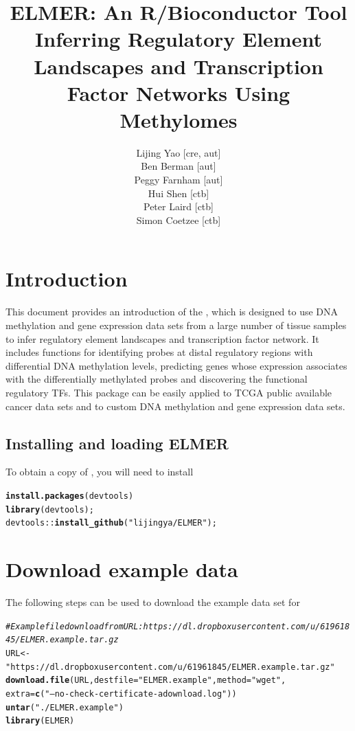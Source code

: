 \documentclass{article}\usepackage[]{graphicx}\usepackage[usenames,dvipsnames]{color}
\title{ELMER: An R/Bioconductor Tool \\
Inferring Regulatory Element Landscapes and Transcription Factor Networks Using Methylomes}
\author {Lijing Yao [cre, aut]\\
Ben Berman [aut]\\
Peggy Farnham [aut]\\
Hui Shen [ctb]\\
Peter Laird [ctb]\\
Simon Coetzee [ctb]}
\makeatletter
\newcommand{\hlstr}[1]{\textcolor[rgb]{0.192,0.494,0.8}{#1}}%
\newcommand{\hlcom}[1]{\textcolor[rgb]{0.678,0.584,0.686}{\textit{#1}}}%
\newcommand{\hlopt}[1]{\textcolor[rgb]{0,0,0}{#1}}%
\newcommand{\hlstd}[1]{\textcolor[rgb]{0.345,0.345,0.345}{#1}}%
\newcommand{\hlkwb}[1]{\textcolor[rgb]{0.69,0.353,0.396}{#1}}%
\newcommand{\hlkwc}[1]{\textcolor[rgb]{0.333,0.667,0.333}{#1}}%
\newcommand{\hlkwd}[1]{\textcolor[rgb]{0.737,0.353,0.396}{\textbf{#1}}}%
\newenvironment{kframe}{%
 \def\at@end@of@kframe{}%
 \ifinner\ifhmode%
  \def\at@end@of@kframe{\end{minipage}}%
  \begin{minipage}{\columnwidth}%
 \fi\fi%
 \def\FrameCommand##1{\hskip\@totalleftmargin \hskip-\fboxsep
 \colorbox{shadecolor}{##1}\hskip-\fboxsep
     \hskip-\linewidth \hskip-\@totalleftmargin \hskip\columnwidth}%
 \MakeFramed {\advance\hsize-\width
   \@totalleftmargin\z@ \linewidth\hsize
   \@setminipage}}%
 {\par\unskip\endMakeFramed%
 \at@end@of@kframe}
\newenvironment{knitrout}{}{} %
\makeatother
\begin{document}
\maketitle

\tableofcontents
\section{Introduction}
This document provides an introduction of the , which is designed 
to use DNA methylation and gene expression data sets from a large number
of tissue samples to infer regulatory element landscapes and transcription factor network.
It includes functions for identifying probes at distal regulatory regions with differential 
DNA methylation levels, predicting genes whose expression associates with the differentially
methylated probes and discovering the functional regulatory TFs. This package can be easily
applied to TCGA public available cancer data sets and to custom DNA methylation 
and gene expression data sets. 

\subsection{Installing and loading ELMER}
To obtain a copy of , you will need to install 
\begin{knitrout}
\color{fgcolor}\begin{kframe}
\begin{alltt}
\hlkwd{install.packages}\hlstd{(devtools)}
\hlkwd{library}\hlstd{(devtools);}
\hlstd{devtools}\hlopt{::}\hlkwd{install_github}\hlstd{(}\hlstr{"lijingya/ELMER"}\hlstd{);}
\end{alltt}
\end{kframe}
\end{knitrout}

\section{Download example data}
The following steps can be used to download the example data set for 


\begin{knitrout}
\color{fgcolor}\begin{kframe}
\begin{alltt}
\hlcom{#Example file download from URL: https://dl.dropboxusercontent.com/u/61961845/ELMER.example.tar.gz}
\hlstd{URL} \hlkwb{<-} \hlstr{"https://dl.dropboxusercontent.com/u/61961845/ELMER.example.tar.gz"}
\hlkwd{download.file}\hlstd{(URL,}\hlkwc{destfile} \hlstd{=} \hlstr{"ELMER.example"}\hlstd{,}\hlkwc{method}\hlstd{=} \hlstr{"wget"}\hlstd{,}
              \hlkwc{extra} \hlstd{=} \hlkwd{c}\hlstd{(}\hlstr{"--no-check-certificate -a download.log"}\hlstd{))}
\hlkwd{untar}\hlstd{(}\hlstr{"./ELMER.example"}\hlstd{)}
\hlkwd{library}\hlstd{(ELMER)}
\end{alltt}
\end{kframe}
\end{knitrout}
\end{document}
